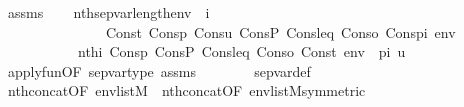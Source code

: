 \begin{isabellebody}
\ assms\isanewline
\ \ \isamarkupfalse%
\ {\isachardoublequoteopen}nth{\isacharparenleft}{\kern0pt}sep{\isacharunderscore}{\kern0pt}var{\isacharparenleft}{\kern0pt}length{\isacharparenleft}{\kern0pt}env{\isacharparenright}{\kern0pt}{\isacharparenright}{\kern0pt}\ {\isacharbackquote}{\kern0pt}\ i{\isacharcomma}{\kern0pt}\isanewline
\ \ \ \ \ \ \ \ \ \ \ \ \ \ \ Cons{\isacharparenleft}{\kern0pt}t{\isacharcomma}{\kern0pt}\ Cons{\isacharparenleft}{\kern0pt}p{\isacharcomma}{\kern0pt}\ Cons{\isacharparenleft}{\kern0pt}u{\isacharcomma}{\kern0pt}\ Cons{\isacharparenleft}{\kern0pt}P{\isacharcomma}{\kern0pt}\ Cons{\isacharparenleft}{\kern0pt}leq{\isacharcomma}{\kern0pt}\ Cons{\isacharparenleft}{\kern0pt}o{\isacharcomma}{\kern0pt}\ Cons{\isacharparenleft}{\kern0pt}pi{\isacharcomma}{\kern0pt}\ env{\isacharparenright}{\kern0pt}{\isacharparenright}{\kern0pt}{\isacharparenright}{\kern0pt}{\isacharparenright}{\kern0pt}{\isacharparenright}{\kern0pt}{\isacharparenright}{\kern0pt}{\isacharparenright}{\kern0pt}{\isacharparenright}{\kern0pt}\ {\isacharequal}{\kern0pt}\isanewline
\ \ \ \ \ \ \ \ \ \ \ nth{\isacharparenleft}{\kern0pt}i{\isacharcomma}{\kern0pt}\ Cons{\isacharparenleft}{\kern0pt}p{\isacharcomma}{\kern0pt}\ Cons{\isacharparenleft}{\kern0pt}P{\isacharcomma}{\kern0pt}\ Cons{\isacharparenleft}{\kern0pt}leq{\isacharcomma}{\kern0pt}\ Cons{\isacharparenleft}{\kern0pt}o{\isacharcomma}{\kern0pt}\ Cons{\isacharparenleft}{\kern0pt}t{\isacharcomma}{\kern0pt}\ env\ {\isacharat}{\kern0pt}\ {\isacharbrackleft}{\kern0pt}pi{\isacharcomma}{\kern0pt}\ u{\isacharbrackright}{\kern0pt}{\isacharparenright}{\kern0pt}{\isacharparenright}{\kern0pt}{\isacharparenright}{\kern0pt}{\isacharparenright}{\kern0pt}{\isacharparenright}{\kern0pt}{\isacharparenright}{\kern0pt}{\isachardoublequoteclose}\ \ \isanewline
\ \ \ \ \isamarkupfalse%
\ apply{\isacharunderscore}{\kern0pt}fun{\isacharbrackleft}{\kern0pt}OF\ sep{\isacharunderscore}{\kern0pt}var{\isacharunderscore}{\kern0pt}type{\isacharbrackright}{\kern0pt}\ assms\isanewline
\ \ \ \ \ \ \isamarkupfalse%
\ sep{\isacharunderscore}{\kern0pt}var{\isacharunderscore}{\kern0pt}def\isanewline
\ \ \ \ \ \ \isamarkupfalse%
\ nth{\isacharunderscore}{\kern0pt}concat{}{\isacharbrackleft}{\kern0pt}OF\ {\isacartoucheopen}env{\isasymin}list{\isacharparenleft}{\kern0pt}M{\isacharparenright}{\kern0pt}{\isacartoucheclose}{\isacharbrackright}{\kern0pt}\ \ nth{\isacharunderscore}{\kern0pt}concat{}{\isacharbrackleft}{\kern0pt}OF\ {\isacartoucheopen}env{\isasymin}list{\isacharparenleft}{\kern0pt}M{\isacharparenright}{\kern0pt}{\isacartoucheclose}{\isacharcomma}{\kern0pt}symmetric{\isacharbrackright}{\kern0pt}\isanewline

\end{isabellebody}
